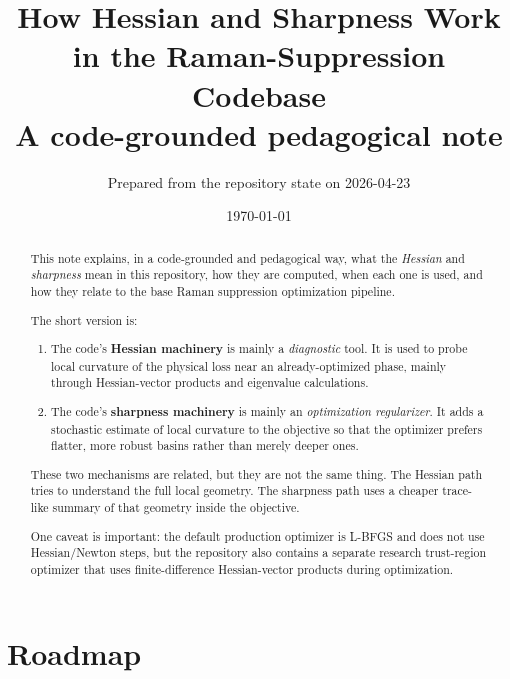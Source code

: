 \documentclass[11pt,letterpaper]{article}
\title{\textbf{How Hessian and Sharpness Work in the Raman-Suppression Codebase}\\[4pt]
\large A code-grounded pedagogical note}
\author{Prepared from the repository state on 2026-04-23}
\date{\today}
\begin{document}
\maketitle

\begin{abstract}
This note explains, in a code-grounded and pedagogical way, what the
\emph{Hessian} and \emph{sharpness} mean in this repository, how they are
computed, when each one is used, and how they relate to the base Raman
suppression optimization pipeline.

The short version is:
\begin{enumerate}[leftmargin=*]
  \item The code's \textbf{Hessian machinery} is mainly a \emph{diagnostic}
  tool. It is used to probe local curvature of the physical loss near an
  already-optimized phase, mainly through Hessian-vector products and
  eigenvalue calculations.
  \item The code's \textbf{sharpness machinery} is mainly an
  \emph{optimization regularizer}. It adds a stochastic estimate of local
  curvature to the objective so that the optimizer prefers flatter, more robust
  basins rather than merely deeper ones.
\end{enumerate}

These two mechanisms are related, but they are not the same thing. The
Hessian path tries to understand the full local geometry. The sharpness path
uses a cheaper trace-like summary of that geometry inside the objective.

One caveat is important: the default production optimizer is L-BFGS and does
not use Hessian/Newton steps, but the repository also contains a separate
research trust-region optimizer that uses finite-difference Hessian-vector
products during optimization.
\end{abstract}

\section{Roadmap}
\end{document}

